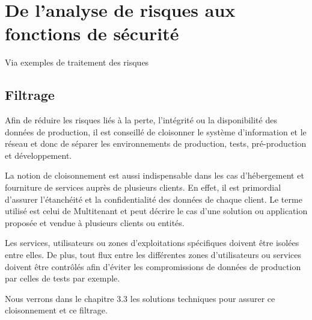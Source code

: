 \section{De l’analyse de risques aux fonctions de sécurité}
Via exemples de traitement des risques 
\subsection{Filtrage}

Afin de réduire les risques liés à la perte, l'intégrité ou la disponibilité des données de production, il est conseillé de cloisonner le système d'information et le réseau et donc de séparer les environnements de production, tests, pré-production et développement.

La notion de cloisonnement est aussi indispensable dans les cas d'hébergement et fourniture de services auprès de plusieurs clients. En effet, il est primordial d'assurer l'étanchéité et la confidentialité des données de chaque client. Le terme utilisé est celui de Multitenant et peut décrire le cas d'une solution ou application proposée et vendue à plusieurs clients ou entités.

Les services, utilisateurs ou zones d'exploitations spécifiques doivent être isolées entre elles. De plus, tout flux entre les différentes zones d'utilisateurs ou services doivent être contrôlés afin d'éviter les compromissions de données de production par celles de tests par exemple.

Nous verrons dans le chapitre 3.3 les solutions techniques pour assurer ce cloisonnement et ce filtrage.


